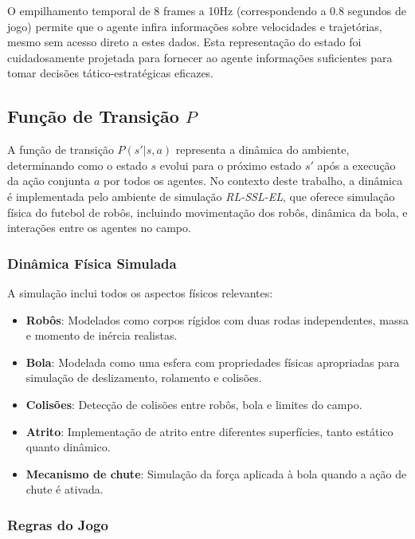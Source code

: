 O empilhamento temporal de 8 frames a 10Hz (correspondendo a 0.8 segundos de jogo) permite que o agente infira informações sobre velocidades e trajetórias, mesmo sem acesso direto a estes dados. Esta representação do estado foi cuidadosamente projetada para fornecer ao agente informações suficientes para tomar decisões tático-estratégicas eficazes.

\subsection{Função de Transição $P$}

A função de transição $P(s' | s, a)$ representa a dinâmica do ambiente, determinando como o estado $s$ evolui para o próximo estado $s'$ após a execução da ação conjunta $a$ por todos os agentes. No contexto deste trabalho, a dinâmica é implementada pelo ambiente de simulação \textit{RL-SSL-EL}, que oferece simulação física do futebol de robôs, incluindo movimentação dos robôs, dinâmica da bola, e interações entre os agentes no campo.

\subsubsection{Dinâmica Física Simulada}

A simulação inclui todos os aspectos físicos relevantes:

\begin{itemize}
    \item \textbf{Robôs}: Modelados como corpos rígidos com duas rodas independentes, massa e momento de inércia realistas.
    \item \textbf{Bola}: Modelada como uma esfera com propriedades físicas apropriadas para simulação de deslizamento, rolamento e colisões.
    \item \textbf{Colisões}: Detecção de colisões entre robôs, bola e limites do campo.
    \item \textbf{Atrito}: Implementação de atrito entre diferentes superfícies, tanto estático quanto dinâmico.
    \item \textbf{Mecanismo de chute}: Simulação da força aplicada à bola quando a ação de chute é ativada.
\end{itemize}

\subsubsection{Regras do Jogo}

